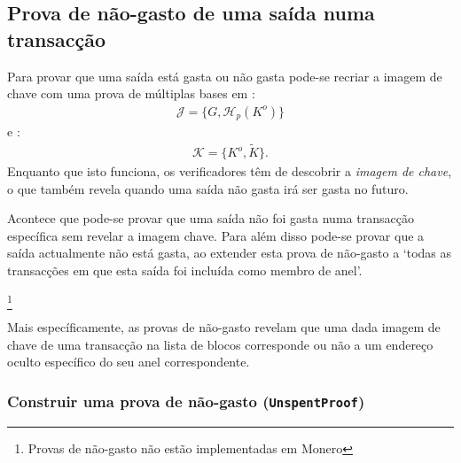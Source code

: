 \subsection{Prova de não-gasto de uma saída numa transacção}
\label{subsec:proofs-owned-output-spent-unspentproof}

Para provar que uma saída está gasta ou não gasta pode-se recriar a imagem de chave com uma prova de múltiplas bases em :
\begin{align*}
\mathcal{J} = \{G,\mathcal{H}_p(K^o)\}
\end{align*}
e :
\begin{align*}
\mathcal{K} = \{K^o,\tilde{K}\}.
\end{align*}
Enquanto que isto funciona, os verificadores têm de descobrir a {\em imagem de chave}, o que também revela quando uma saída não gasta irá ser gasta no futuro.

Acontece que pode-se provar que uma saída não foi gasta numa transacção específica sem revelar a imagem chave. Para além disso pode-se provar que a saída actualmente não está gasta, ao extender esta prova de não-gasto \cite{unspent-proof-issue-68} a `todas as transacções em que esta saída foi incluída como membro de anel'.

\footnote{Provas de não-gasto não estão implementadas em Monero}

Mais específicamente, as provas de não-gasto revelam que uma dada imagem de chave de uma transacção na lista de blocos corresponde ou não a um endereço oculto específico do seu anel correspondente. 


\subsubsection*{Construir uma prova de não-gasto ({\tt UnspentProof})}

